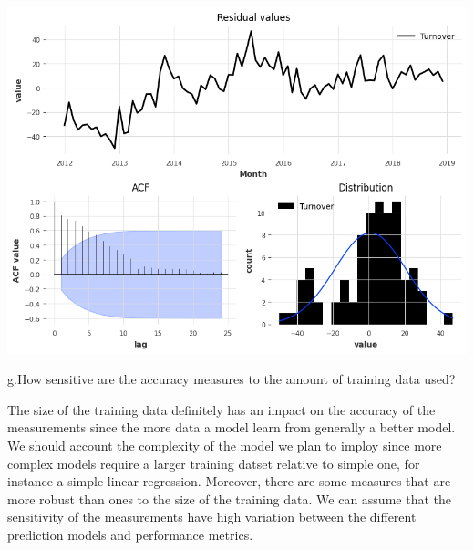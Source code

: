 \documentclass[
  11pt,
]{article}
\begin{document}
\includegraphics{hw3_files/figure-pdf/cell-57-output-1.png}

g.How sensitive are the accuracy measures to the amount of training data
used?

The size of the training data definitely has an impact on the accuracy
of the measurements since the more data a model learn from generally a
better model. We should account the complexity of the model we plan to
imploy since more complex models require a larger training datset
relative to simple one, for instance a simple linear regression.
Moreover, there are some measures that are more robust than ones to the
size of the training data. We can assume that the sensitivity of the
measurements have high variation between the different prediction models
and performance metrics.
\end{document}

